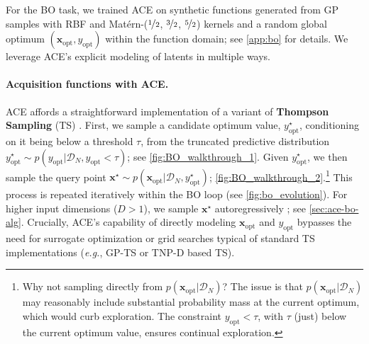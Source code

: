 \documentclass[twoside]{article}
\makeatletter
\newcommand{\x}{\mathbf{x}}
\newcommand{\data}{\mathcal{D}}
\newcommand{\xopt}{\x_\text{opt}}
\newcommand{\yopt}{y_\text{opt}}
\newcommand{\eg}{\textit{e.g.}\@\xspace}
\makeatother
\begin{document}
For the BO task, we trained ACE on synthetic functions generated from GP samples with RBF and Matérn-($\nicefrac{1}{2}$, $\nicefrac{3}{2}$, $\nicefrac{5}{2}$) kernels and a random global optimum $(\xopt,\yopt)$ within the function domain; see \cref{app:bo} for details.  We leverage ACE's explicit modeling of latents in multiple ways.

\paragraph{Acquisition functions with ACE.}

ACE affords a straightforward implementation of a variant of \textbf{Thompson Sampling} (TS) \citep{dutordoir2023neural, liu2024large}. First, we sample a candidate optimum value, $\yopt^\star$, conditioning on it being below a threshold $\tau$, from the truncated predictive distribution $\yopt^\star \sim p(\yopt | \data_N, \yopt<\tau)$; see \cref{fig:BO_walkthrough_1}. Given $\yopt^\star$, we then sample the query point $\x^\star \sim p(\xopt | \data_N, \yopt^\star)$; \cref{fig:BO_walkthrough_2}.\footnote{Why not sampling directly from $p(\xopt | \data_N)$? The issue is that $p(\xopt | \data_N)$ may reasonably include substantial probability mass at the current optimum, which would curb exploration. The constraint $\yopt < \tau$, with $\tau$ (just) below the current optimum value, ensures continual exploration.} This process is repeated iteratively within the BO loop (see \cref{fig:bo_evolution}). For higher input dimensions ($D > 1$), we sample $\x^\star$ autoregressively \citep{bruinsma2023autoregressive}; see \cref{sec:ace-bo-alg}. Crucially, ACE's capability of directly modeling $\xopt$ and $\yopt$ bypasses the need for surrogate optimization or grid searches typical of standard TS implementations (\eg, GP-TS or TNP-D based TS).


\end{document}
